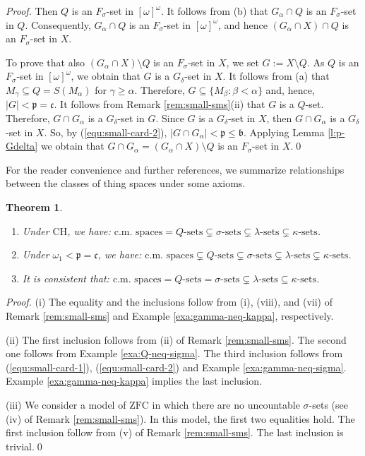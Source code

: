 \documentclass[preprint,11pt]{elsarticle}
\newtheorem{theorem}{Theorem}[section]
\numberwithin{equation}{section}
\numberwithin{theorem}{section}
\newcommand{\w}{\omega}
\def\al{\alpha}
\def\cm/{{c.m.}}
\begin{document}
\begin{proof}
Then $Q$ is an $F_\sigma$-set in $[\w]^\w$. It follows from (b) that $G_\alpha \cap Q$ is an $F_\sigma$-set in $Q$.
Consequently, $G_\alpha \cap Q$ is an $F_\sigma$-set in $[\w]^\w$, and hence $(G_\alpha\cap X) \cap Q$ is an $F_\sigma$-set in $X$.
\smallskip

To prove that also $(G_\alpha\cap X)\setminus Q$ is an $F_\sigma$-set in $X$, we set $G:=X\setminus Q$. As $Q$ is an $F_\sigma$-set in $[\w]^\w$, we obtain that $G$ is a $G_\delta$-set in $X$.
It follows from (a) that $M_\gamma \subseteq Q=S(M_\al)$ for $\gamma\geq \al$.
Therefore, $G\subseteq \{M_\beta:\beta<\alpha\}$ and, hence, $|G|<\mathfrak{p}=\mathfrak{c}$.
It follows from Remark \ref{rem:small-sms}(ii) that $G$ is a $Q$-set.
Therefore, $G\cap G_\alpha$ is a $G_\delta$-set in $G$. Since $G$ is a $G_\delta$-set in $X$, then $G\cap G_\alpha$ is a $G_\delta$-set in $X$. So, by (\ref{equ:small-card-2}),  $|G\cap G_\al|< \mathfrak{p}\leq \mathfrak{b}$. Applying Lemma \ref{l:p-Gdelta} we obtain that $G\cap G_\alpha=(G_\alpha\cap X)\setminus Q$ is an $F_\sigma$-set in $X$.\qed
\end{proof}

For the reader convenience and further references, we summarize relationships between the classes of thing spaces under some axioms.

\begin{theorem}\label{t:sms}
\begin{enumerate}
\item[{\rm (i)}] Under $\mathrm{CH}$, we have:
$\mbox{\cm/ spaces} = \mbox{$Q$-sets} \subsetneq \mbox{$\sigma$-sets}  \subsetneq \mbox{$\lambda$-sets} \subsetneq \mbox{$\kappa$-sets}$.
\item[{\rm (ii)}] Under  $\w_1<\mathfrak{p}=\mathfrak{c}$, we have:
$\mbox{\cm/ spaces} \subsetneq \mbox{$Q$-sets} \subsetneq \mbox{$\sigma$-sets}  \subsetneq \mbox{$\lambda$-sets} \subsetneq \mbox{$\kappa$-sets}$.
\item[{\rm (iii)}] It is consistent that: $\mbox{\cm/ spaces} = \mbox{$Q$-sets} = \mbox{$\sigma$-sets}  \subsetneq \mbox{$\lambda$-sets} \subseteq \mbox{$\kappa$-sets}$.
\end{enumerate}
\end{theorem}

\begin{proof}
(i) The equality and the inclusions follow from (i), (viii), and (vii) of Remark \ref{rem:small-sms} and Example \ref{exa:gamma-neq-kappa}, respectively.
\smallskip

(ii) The first inclusion follows from (ii) of Remark \ref{rem:small-sms}. The second one follows from Example \ref{exa:Q-neq-sigma}. The third inclusion follows from (\ref{equ:small-card-1}), (\ref{equ:small-card-2}) and Example \ref{exa:gamma-neq-sigma}. Example \ref{exa:gamma-neq-kappa} implies the last inclusion.
\smallskip

(iii) We consider a model of $\mathrm{ZFC}$ in which there are no uncountable $\sigma$-sets (see (iv) of Remark \ref{rem:small-sms}). In this model, the first two equalities hold.
The first inclusion follow from  (v) of Remark \ref{rem:small-sms}.
The last inclusion is trivial.\qed
\end{proof}
\end{document}

